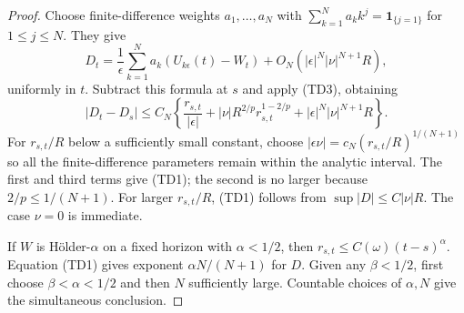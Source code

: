 \documentclass[11pt]{article}
\theoremstyle{definition}\newtheorem{definition}[theorem]{Definition}
\theoremstyle{remark}\newtheorem{remark}[theorem]{Remark}
\begin{document}
\begin{proof}
Choose finite-difference weights $a_1,\dots,a_N$ with
$\sum_{k=1}^N a_kk^j=\mathbf1_{\{j=1\}}$ for $1\le j\le N$.
They give
\[
 D_t=\frac1\epsilon\sum_{k=1}^Na_k
       (U_{k\epsilon}(t)-W_t)
       +O_N(|\epsilon|^N|\nu|^{N+1}R),
 \tag{TD4}
\]
uniformly in $t$. Subtract this formula at $s$ and apply (TD3), obtaining
\[
 |D_t-D_s|\le C_N\left\{
 \frac{r_{s,t}}{|\epsilon|}
 +|\nu|R^{2/p}r_{s,t}^{1-2/p}
 +|\epsilon|^N|\nu|^{N+1}R\right\}.
 \tag{TD5}
\]
For $r_{s,t}/R$ below a sufficiently small constant, choose
$|\epsilon\nu|=c_N(r_{s,t}/R)^{1/(N+1)}$ so all the finite-difference
parameters remain within the analytic interval. The first and third
terms give (TD1); the second is no larger because $2/p\le1/(N+1)$.
For larger $r_{s,t}/R$, (TD1) follows from $\sup|D|\le C|\nu|R$.
The case $\nu=0$ is immediate.

If $W$ is H\"older-$\alpha$ on a fixed horizon with $\alpha<1/2$,
then $r_{s,t}\le C(\omega)(t-s)^\alpha$. Equation (TD1) gives exponent
$\alpha N/(N+1)$ for $D$. Given any $\beta<1/2$, first choose
$\beta<\alpha<1/2$ and then $N$ sufficiently large. Countable choices
of $\alpha,N$ give the simultaneous conclusion.
\end{proof}
\end{document}
